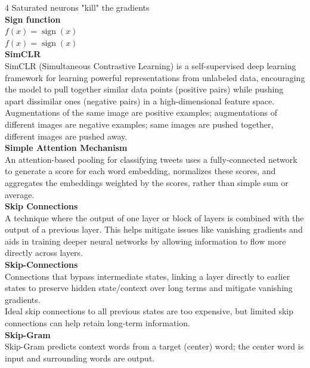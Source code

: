 \documentclass[8pt]{extarticle}
\begin{document}
\begin{multicols}{4}
{Saturated neurons "kill" the gradients\\
\vspace{2pt}\textbf{Sign function}\\
$f(x) = \operatorname{sign}(x)$\\
$f(x) = \operatorname{sign}(x)$\\
\vspace{2pt}\textbf{SimCLR}\\
SimCLR (Simultaneous Contrastive Learning) is a self-supervised deep learning framework for learning powerful representations from unlabeled data, encouraging the model to pull together similar data points (positive pairs) while pushing apart dissimilar ones (negative pairs) in a high-dimensional feature space.\\
Augmentations of the same image are positive examples; augmentations of different images are negative examples; same images are pushed together, different images are pushed away.\\
\vspace{2pt}\textbf{Simple Attention Mechanism}\\
An attention-based pooling for classifying tweets uses a fully-connected network to generate a score for each word embedding, normalizes these scores, and aggregates the embeddings weighted by the scores, rather than simple sum or average.\\
\vspace{2pt}\textbf{Skip Connections}\\
A technique where the output of one layer or block of layers is combined with the output of a previous layer. This helps mitigate issues like vanishing gradients and aids in training deeper neural networks by allowing information to flow more directly across layers.\\
\vspace{2pt}\textbf{Skip-Connections}\\
Connections that bypass intermediate states, linking a layer directly to earlier states to preserve hidden state/context over long terms and mitigate vanishing gradients.\\
Ideal skip connections to all previous states are too expensive, but limited skip connections can help retain long-term information.\\
\vspace{2pt}\textbf{Skip-Gram}\\
Skip-Gram predicts context words from a target (center) word; the center word is input and surrounding words are output.\\

}
\end{multicols}
\end{document}
